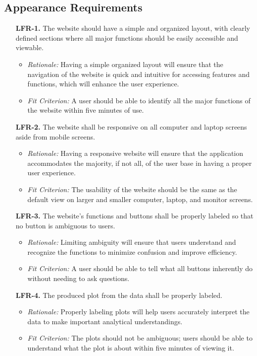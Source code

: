 \documentclass[12pt]{article}
\begin{document}
\subsection{Appearance Requirements}
\begin{enumerate}
  \item[\textbf{LFR-1.}] The website should have a simple and organized layout, with
  clearly defined sections where all major functions should be easily accessible
  and viewable.
  \begin{itemize}
    \item \textit{Rationale:} Having a simple organized layout will ensure that the
    navigation of the website is quick and intuitive for accessing features and
    functions, which will enhance the user experience.
    \item \textit{Fit Criterion:} A user should be able to identify all the major
    functions of the website within five minutes of use.
  \end{itemize}
  
  \item[\textbf{LFR-2.}] The website shall be responsive on all computer and laptop screens
  aside from mobile screens.
  \begin{itemize}
    \item \textit{Rationale:} Having a responsive website will ensure that the
    application accommodates the majority, if not all, of the user base in having a
    proper user experience. 
    \item \textit{Fit Criterion:} The usability of the website should be the same
    as the default view on larger and smaller computer, laptop, and monitor screens.
  \end{itemize}
  
  \item[\textbf{LFR-3.}] The website's functions and buttons shall be properly labeled
  so that no button is ambiguous to users.
  \begin{itemize}
    \item \textit{Rationale:} Limiting ambiguity will ensure that users
    understand and recognize the functions to minimize confusion and improve
    efficiency.
    \item \textit{Fit Criterion:} A user should be able to tell what all buttons
    inherently do without needing to ask questions.
  \end{itemize}
  
  \item[\textbf{LFR-4.}] The produced plot from the data shall be properly labeled.
  \begin{itemize}
    \item \textit{Rationale:} Properly labeling plots will help users
    accurately interpret the data to make important analytical understandings.
    \item \textit{Fit Criterion:} The plots should not be ambiguous; users
    should be able to understand what the plot is about within five minutes of
    viewing it.
  \end{itemize}
\end{enumerate}
\end{document}
